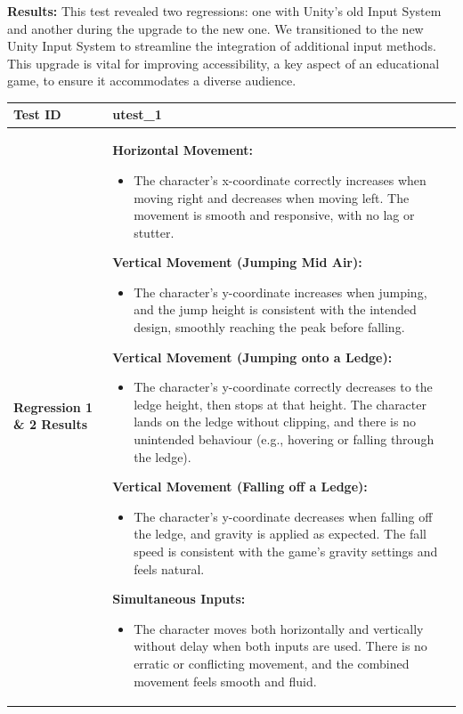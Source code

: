 \documentclass[11pt, a4paper]{article}
\begin{document}
\newpage

\noindent \textbf{Results:} This test revealed two regressions: one with Unity's old Input System and another during the upgrade to the new one. We transitioned to the new Unity Input System to streamline the integration of additional input methods. This upgrade is vital for improving accessibility, a key aspect of an educational game, to ensure it accommodates a diverse audience.

\begin{center}
\begin{tabularx}{\linewidth}{|>{\raggedright\arraybackslash}m{4cm}|X|}
    \hline
    \textbf{Test ID} & utest\_1 \\
    \hline
    \textbf{Regression 1 \& 2 Results} &
    \textbf{Horizontal Movement:}
    \begin{itemize}
        \item The character’s x-coordinate correctly increases when moving right and decreases when moving left. The movement is smooth and responsive, with no lag or stutter.
    \end{itemize}
    \textbf{Vertical Movement (Jumping Mid Air):}
    \begin{itemize}
        \item The character’s y-coordinate increases when jumping, and the jump height is consistent with the intended design, smoothly reaching the peak before falling.
    \end{itemize}
    \textbf{Vertical Movement (Jumping onto a Ledge):}
     \begin{itemize}
        \item The character’s y-coordinate correctly decreases to the ledge height, then stops at that height. The character lands on the ledge without clipping, and there is no unintended behaviour (e.g., hovering or falling through the ledge).
    \end{itemize}
    \textbf{Vertical Movement (Falling off a Ledge):}
    \begin{itemize}
        \item The character’s y-coordinate decreases when falling off the ledge, and gravity is applied as expected. The fall speed is consistent with the game’s gravity settings and feels natural.
    \end{itemize}
    \textbf{Simultaneous Inputs:}
    \begin{itemize}
        \item The character moves both horizontally and vertically without delay when both inputs are used. There is no erratic or conflicting movement, and the combined movement feels smooth and fluid.

\end{itemize}
\end{tabularx}
\end{center}
\end{document}
